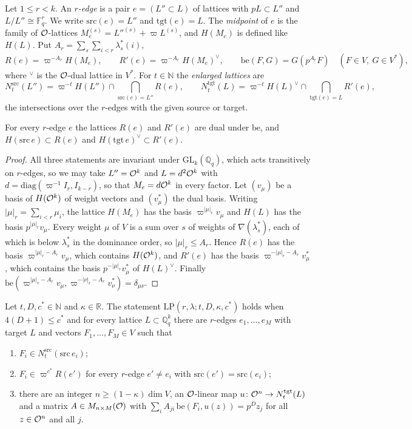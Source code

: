 Let $1\le r<k$. An \emph{$r$-edge} is a pair $e=(L''\subset L)$ of lattices with $pL\subset L''$ and $L/L''\cong\mathbb F_q^r$. We write $\mathrm{src}(e)=L''$ and $\mathrm{tgt}(e)=L$. The \emph{midpoint} of $e$ is the family of $\mathcal O$-lattices $M_e^{(s)}=L''^{(s)}+\varpi L^{(s)}$, and $H(M_e)$ is defined like $H(L)$. Put $A_r=\sum_s\sum_{i<r}\lambda^*_s(i)$,
\[
R(e)=\varpi^{-A_r}H(M_e),\qquad R'(e)=\varpi^{-A_r}H(M_e)^\vee,\qquad \mathrm{be}(F,G)=G(p^{A_r}F)\quad(F\in V,\ G\in V^*),
\]
where $^\vee$ is the $\mathcal O$-dual lattice in $V^*$. For $t\in\mathbb N$ the \emph{enlarged lattices} are
\[
N^{\mathrm{src}}_t(L'')=\varpi^{-t}H(L'')\cap\bigcap_{\mathrm{src}(e)=L''}R(e),\qquad N^{\mathrm{tgt}}_t(L)=\varpi^{-t}H(L)^\vee\cap\bigcap_{\mathrm{tgt}(e)=L}R'(e),
\]
the intersections over the $r$-edges with the given source or target.

\begin{lemma}\label{r2:perfect}
For every $r$-edge $e$ the lattices $R(e)$ and $R'(e)$ are dual under $\mathrm{be}$, and $H(\mathrm{src}\,e)\subset R(e)$ and $H(\mathrm{tgt}\,e)^\vee\subset R'(e)$.
\end{lemma}

\begin{proof}
All three statements are invariant under $\mathrm{GL}_k(\mathbb Q_q)$, which acts transitively on $r$-edges, so we may take $L''=\mathcal O^k$ and $L=d^2\mathcal O^k$ with $d=\mathrm{diag}(\varpi^{-1}I_r,I_{k-r})$, so that $M_e=d\mathcal O^k$ in every factor. Let $(v_\mu)$ be a basis of $H(\mathcal O^k)$ of weight vectors and $(v^*_\mu)$ the dual basis. Writing $|\mu|_r=\sum_{i<r}\mu_i$, the lattice $H(M_e)$ has the basis $\varpi^{|\mu|_r}v_\mu$ and $H(L)$ has the basis $p^{|\mu|_r}v_\mu$. Every weight $\mu$ of $V$ is a sum over $s$ of weights of $\nabla(\lambda^*_s)$, each of which is below $\lambda^*_s$ in the dominance order, so $|\mu|_r\le A_r$. Hence $R(e)$ has the basis $\varpi^{|\mu|_r-A_r}v_\mu$, which contains $H(\mathcal O^k)$, and $R'(e)$ has the basis $\varpi^{-|\mu|_r-A_r}v^*_\mu$, which contains the basis $p^{-|\mu|_r}v^*_\mu$ of $H(L)^\vee$. Finally $\mathrm{be}(\varpi^{|\mu|_r-A_r}v_\mu,\varpi^{-|\nu|_r-A_r}v^*_\nu)=\delta_{\mu\nu}$.
\end{proof}

\begin{definition}\label{r2:LP}
Let $t,D,c^*\in\mathbb N$ and $\kappa\in\mathbb R$. The statement $\mathrm{LP}(r,\lambda;t,D,\kappa,c^*)$ holds when $4(D+1)\le c^*$ and for every lattice $L\subset\mathbb Q_q^k$ there are $r$-edges $e_1,\dots,e_M$ with target $L$ and vectors $F_1,\dots,F_M\in V$ such that
\begin{enumerate}
\item[(i)] $F_i\in N^{\mathrm{src}}_t(\mathrm{src}\,e_i)$;
\item[(ii)] $F_i\in\varpi^{c^*}R(e')$ for every $r$-edge $e'\ne e_i$ with $\mathrm{src}(e')=\mathrm{src}(e_i)$;
\item[(iii)] there are an integer $n\ge(1-\kappa)\dim V$, an $\mathcal O$-linear map $u\colon\mathcal O^n\to N^{\mathrm{tgt}}_t(L)$ and a matrix $A\in M_{n\times M}(\mathcal O)$ with $\sum_iA_{ji}\,\mathrm{be}(F_i,u(z))=p^Dz_j$ for all $z\in\mathcal O^n$ and all $j$.
\end{enumerate}
\end{definition}

